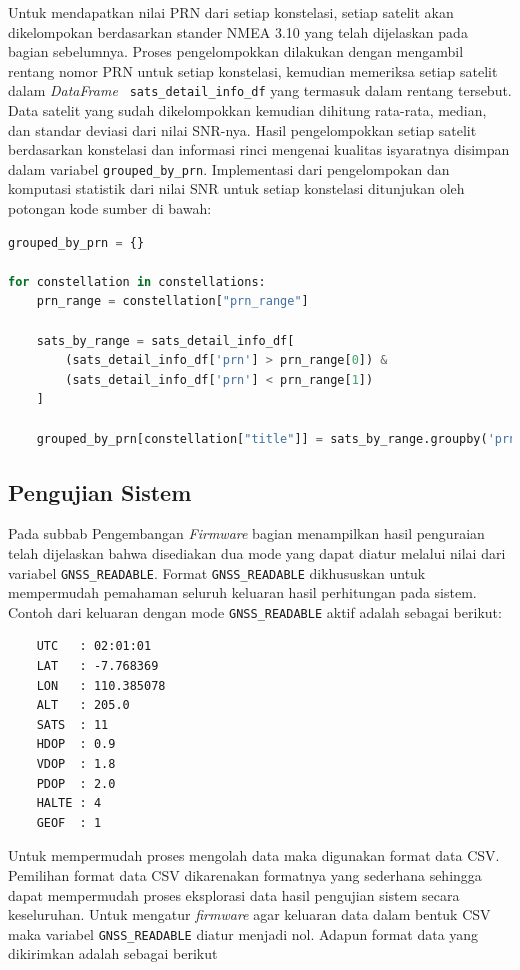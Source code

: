 Untuk mendapatkan nilai PRN dari setiap konstelasi, setiap satelit akan dikelompokan berdasarkan stander NMEA 3.10 yang telah dijelaskan pada bagian sebelumnya. Proses pengelompokkan dilakukan dengan mengambil rentang nomor PRN untuk setiap konstelasi, kemudian memeriksa setiap satelit dalam \textit{DataFrame} \texttt{ sats\_detail\_info\_df} yang termasuk dalam rentang tersebut. Data satelit yang sudah dikelompokkan kemudian dihitung rata-rata, median, dan standar deviasi dari nilai SNR-nya. Hasil pengelompokkan setiap satelit berdasarkan konstelasi dan informasi rinci mengenai kualitas isyaratnya disimpan dalam variabel \texttt{grouped\_by\_prn}. Implementasi dari pengelompokan dan komputasi statistik dari nilai SNR untuk setiap konstelasi ditunjukan oleh potongan kode sumber di bawah:

\begin{lstlisting}[language=python]
grouped_by_prn = {}

for constellation in constellations:
	prn_range = constellation["prn_range"]
	
	sats_by_range = sats_detail_info_df[
		(sats_detail_info_df['prn'] > prn_range[0]) & 
		(sats_detail_info_df['prn'] < prn_range[1])
	]
	
	grouped_by_prn[constellation["title"]] = sats_by_range.groupby('prn')['snr'].agg(['mean', 'median', 'std'])
\end{lstlisting}
\fi

\subsection{Pengujian Sistem}
Pada subbab Pengembangan \textit{Firmware} bagian menampilkan hasil penguraian telah dijelaskan bahwa disediakan dua mode yang dapat diatur melalui nilai dari variabel \texttt{GNSS\_READABLE}. Format \texttt{GNSS\_READABLE} dikhususkan untuk mempermudah pemahaman seluruh keluaran hasil perhitungan pada sistem. Contoh dari keluaran dengan mode \texttt{GNSS\_READABLE} aktif adalah sebagai berikut:

\begin{lstlisting}
	UTC   : 02:01:01
	LAT   : -7.768369
	LON   : 110.385078
	ALT   : 205.0
	SATS  : 11
	HDOP  : 0.9
	VDOP  : 1.8
	PDOP  : 2.0
	HALTE : 4
	GEOF  : 1
\end{lstlisting}

Untuk mempermudah proses mengolah data maka digunakan format data CSV. Pemilihan format data CSV dikarenakan formatnya yang sederhana sehingga dapat mempermudah proses eksplorasi data hasil pengujian sistem secara keseluruhan. Untuk mengatur \textit{firmware} agar keluaran data dalam bentuk CSV maka variabel \texttt{GNSS\_READABLE} diatur menjadi nol. Adapun format data yang dikirimkan adalah sebagai berikut


